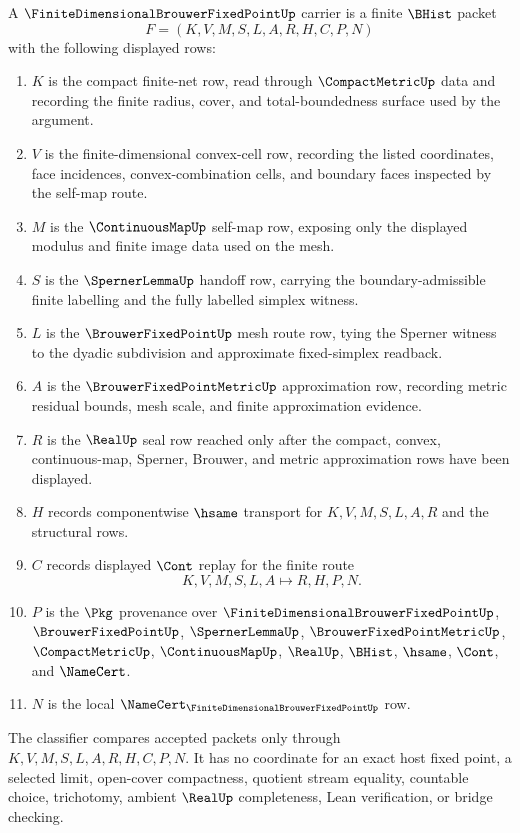 \begin{definition}
\label{def:finite-dimensional-brouwer-fixed-point-carrier}
A $\FiniteDimensionalBrouwerFixedPointUp$ carrier is a finite $\BHist$ packet
$$
F=(K,V,M,S,L,A,R,H,C,P,N)
$$
with the following displayed rows:
\begin{enumerate}
\item $K$ is the compact finite-net row, read through $\CompactMetricUp$ data and recording the finite radius, cover, and total-boundedness surface used by the argument.
\item $V$ is the finite-dimensional convex-cell row, recording the listed coordinates, face incidences, convex-combination cells, and boundary faces inspected by the self-map route.
\item $M$ is the $\ContinuousMapUp$ self-map row, exposing only the displayed modulus and finite image data used on the mesh.
\item $S$ is the $\SpernerLemmaUp$ handoff row, carrying the boundary-admissible finite labelling and the fully labelled simplex witness.
\item $L$ is the $\BrouwerFixedPointUp$ mesh route row, tying the Sperner witness to the dyadic subdivision and approximate fixed-simplex readback.
\item $A$ is the $\BrouwerFixedPointMetricUp$ approximation row, recording metric residual bounds, mesh scale, and finite approximation evidence.
\item $R$ is the $\RealUp$ seal row reached only after the compact, convex, continuous-map, Sperner, Brouwer, and metric approximation rows have been displayed.
\item $H$ records componentwise $\hsame$ transport for $K,V,M,S,L,A,R$ and the structural rows.
\item $C$ records displayed $\Cont$ replay for the finite route
$$
K,V,M,S,L,A \longmapsto R,H,P,N .
$$
\item $P$ is the $\Pkg$ provenance over $\FiniteDimensionalBrouwerFixedPointUp$, $\BrouwerFixedPointUp$, $\SpernerLemmaUp$, $\BrouwerFixedPointMetricUp$, $\CompactMetricUp$, $\ContinuousMapUp$, $\RealUp$, $\BHist$, $\hsame$, $\Cont$, and $\NameCert$.
\item $N$ is the local $\NameCert_{\FiniteDimensionalBrouwerFixedPointUp}$ row.
\end{enumerate}
The classifier compares accepted packets only through $K,V,M,S,L,A,R,H,C,P,N$. It has no coordinate for an exact host fixed point, a selected limit, open-cover compactness, quotient stream equality, countable choice, trichotomy, ambient $\RealUp$ completeness, Lean verification, or bridge checking.
\end{definition}

